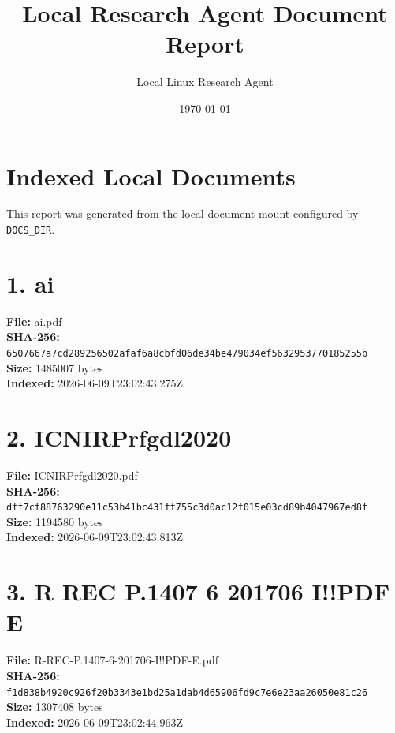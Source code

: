 \documentclass[11pt,a4paper]{article}
\title{Local Research Agent Document Report}
\author{Local Linux Research Agent}
\date{\today}
\begin{document}
\maketitle

\section*{Indexed Local Documents}
This report was generated from the local document mount configured by \texttt{DOCS\_DIR}.

\section*{1. ai}
\textbf{File:} ai.pdf\\
\textbf{SHA-256:} \texttt{6507667a7cd289256502afaf6a8cbfd06de34be479034ef5632953770185255b}\\
\textbf{Size:} 1485007 bytes\\
\textbf{Indexed:} 2026-06-09T23:02:43.275Z

\section*{2. ICNIRPrfgdl2020}
\textbf{File:} ICNIRPrfgdl2020.pdf\\
\textbf{SHA-256:} \texttt{dff7cf88763290e11c53b41bc431ff755c3d0ac12f015e03cd89b4047967ed8f}\\
\textbf{Size:} 1194580 bytes\\
\textbf{Indexed:} 2026-06-09T23:02:43.813Z

\section*{3. R REC P.1407 6 201706 I!!PDF E}
\textbf{File:} R-REC-P.1407-6-201706-I!!PDF-E.pdf\\
\textbf{SHA-256:} \texttt{f1d838b4920c926f20b3343e1bd25a1dab4d65906fd9c7e6e23aa26050e81c26}\\
\textbf{Size:} 1307408 bytes\\
\textbf{Indexed:} 2026-06-09T23:02:44.963Z
\end{document}
